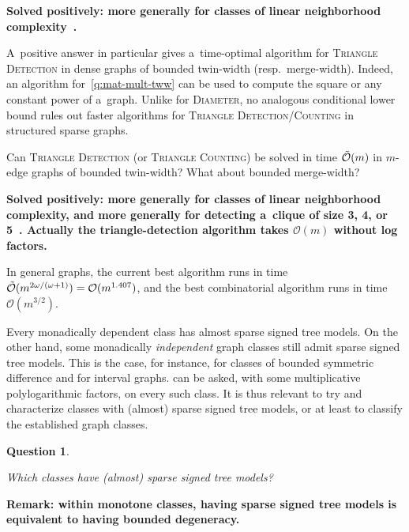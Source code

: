 \documentclass[a4paper,11pt]{article}
\newcommand{\Oh}{\mathcal{O}}
\newtheorem{quest}{Question}
\newenvironment{question}
  {\begin{quest}\begin{mdframed}[style=questionstyle]}
  {\end{mdframed}\end{quest}}
\newtheorem{solved-quest}[quest]{Question}
\newenvironment{solved-question}
  {\begin{solved-quest}\begin{mdframed}[style=solvedquestionstyle]}
  {\end{mdframed}\end{solved-quest}}
\begin{document}
\textbf{Solved positively: more generally for classes of linear neighborhood complexity~\cite{BonnetDPST26}.}

\medskip

A~positive answer in particular gives a~time-optimal algorithm for \textsc{Triangle Detection} in dense graphs of bounded twin-width (resp.~merge-width).
Indeed, an algorithm for~\cref{q:mat-mult-tww} can be used to compute the square or any constant power of a~graph.
Unlike for \textsc{Diameter}, no analogous conditional lower bound rules out faster algorithms for \textsc{Triangle Detection/Counting} in structured sparse graphs.

\begin{solved-question}\label{q:triangle-detection-tww}
  Can \textsc{Triangle Detection} (or \textsc{Triangle Counting}) be solved in time $\Tilde{\Oh}(m)$ in $m$-edge graphs of bounded twin-width? What about bounded merge-width?
\end{solved-question}

\textbf{Solved positively: more generally for classes of linear neighborhood complexity, and more generally for detecting a~clique of size 3, 4, or 5~\cite{BonnetDPST26}. Actually the triangle-detection algorithm takes $\Oh(m)$ without log factors.}

\medskip

In general graphs, the current best algorithm runs in time $\Tilde{\Oh}(m^{2\omega/(\omega+1)})=\Oh(m^{1.407})$, and the best combinatorial algorithm runs in time $\Oh(m^{3/2})$.

Every monadically dependent class has almost sparse signed tree models.
On the other hand, some monadically \emph{independent} graph classes still admit sparse signed tree models.
This is the case, for instance, for classes of bounded symmetric difference and for interval graphs.
 can be asked, with some multiplicative polylogarithmic factors, on every such class.
It is thus relevant to try and characterize classes with (almost) sparse signed tree models, or at least to classify the established graph classes.

\begin{question}\label{q:stm-char}
  Which classes have (almost) sparse signed tree models? 
\end{question}

\textbf{Remark: within monotone classes, having sparse signed tree models is equivalent to having bounded degeneracy.}
\end{document}
